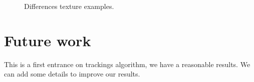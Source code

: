 \begin{figure}[H]
		
\centering

\caption{Differences texture examples.}
\label{Fails1}
\end{figure}








\section{Future work}


This is a first entrance on trackings algorithm, we have a reasonable results. We can add some details to improve our results.


